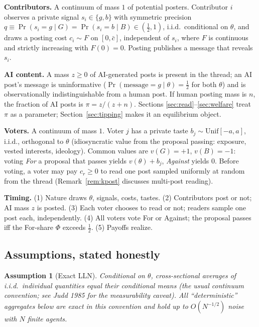 \documentclass[11pt]{article}
\newtheorem{assumption}{Assumption}
\theoremstyle{remark}
\newcommand{\Pro}{\Pr}
\begin{document}
\textbf{Contributors.} A continuum of mass $1$ of potential posters. Contributor
$i$ observes a private signal $s_i\in\{g,b\}$ with symmetric precision
$q\equiv\Pro(s_i=g\mid G)=\Pro(s_i=b\mid B)\in(\tfrac12,1)$, i.i.d.\ conditional
on $\theta$, and draws a posting cost $c_i\sim F$ on $[0,\bar c]$, independent of
$s_i$, where $F$ is continuous and strictly increasing with $F(0)=0$. Posting
publishes a message that reveals $s_i$.

\textbf{AI content.} A mass $z\ge 0$ of AI-generated posts is present in the
thread; an AI post's message is uninformative
($\Pro(\text{message}=g\mid\theta)=\tfrac12$ for both $\theta$) and is
observationally indistinguishable from a human post. If human posting mass is
$n$, the fraction of AI posts is $\pi=z/(z+n)$. Sections
\ref{sec:read}--\ref{sec:welfare} treat $\pi$ as a parameter;
Section~\ref{sec:tipping} makes it an equilibrium object.

\textbf{Voters.} A continuum of mass $1$. Voter $j$ has a private taste
$b_j\sim\mathrm{Unif}[-a,a]$, i.i.d., orthogonal to $\theta$ (idiosyncratic
value from the proposal passing: exposure, vested interests, ideology). Common
values are $v(G)=+1$, $v(B)=-1$: voting \emph{For} a proposal that passes yields
$v(\theta)+b_j$, \emph{Against} yields $0$. Before voting, a voter may pay
$c_r\ge 0$ to read one post sampled uniformly at random from the thread
(Remark~\ref{rem:kpost} discusses multi-post reading).

\textbf{Timing.} (1) Nature draws $\theta$, signals, costs, tastes. (2)
Contributors post or not; AI mass $z$ is posted. (3) Each voter chooses to read
or not; readers sample one post each, independently. (4) All voters vote For or
Against; the proposal passes iff the For-share $\Phi$ exceeds $\tfrac12$.
(5) Payoffs realize.

\subsection{Assumptions, stated honestly}

\begin{assumption}[Exact LLN]\label{ass:lln}
Conditional on $\theta$, cross-sectional averages of i.i.d.\ individual
quantities equal their conditional means (the usual continuum convention; see
Judd 1985 for the measurability caveat). All ``deterministic'' aggregates below
are exact in this convention and hold up to $O(N^{-1/2})$ noise with $N$ finite
agents.
\end{assumption}
\end{document}
